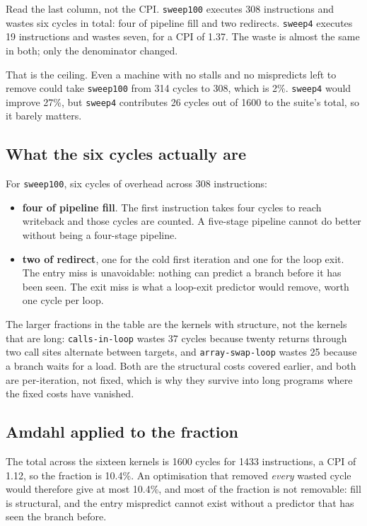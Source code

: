 \documentclass[11pt]{article}
\begin{document}
Read the last column, not the CPI. \texttt{sweep100} executes 308 instructions and wastes six
cycles in total: four of pipeline fill and two redirects. \texttt{sweep4} executes 19
instructions and wastes seven, for a CPI of 1.37. The waste is almost the same in both; only the
denominator changed.

That is the ceiling. Even a machine with no stalls and no mispredicts left to remove could take
\texttt{sweep100} from 314 cycles to 308, which is 2\%. \texttt{sweep4} would improve 27\%, but
\texttt{sweep4} contributes 26 cycles out of 1600 to the suite's total, so it barely matters.

\subsection{What the six cycles actually are}

For \texttt{sweep100}, six cycles of overhead across 308 instructions:

\begin{itemize}
\item \textbf{four of pipeline fill}. The first instruction takes four cycles to reach writeback
  and those cycles are counted. A five-stage pipeline cannot do better without being a
  four-stage pipeline.
\item \textbf{two of redirect}, one for the cold first iteration and one for the loop exit. The
  entry miss is unavoidable: nothing can predict a branch before it has been seen. The exit
  miss is what a loop-exit predictor would remove, worth one cycle per loop.
\end{itemize}

The larger fractions in the table are the kernels with structure, not the kernels that are long:
\texttt{calls-in-loop} wastes 37 cycles because twenty returns through two call sites alternate
between targets, and \texttt{array-swap-loop} wastes 25 because a branch waits for a load. Both
are the structural costs covered earlier, and both are per-iteration, not fixed, which is why
they survive into long programs where the fixed costs have vanished.

\subsection{Amdahl applied to the fraction}

The total across the sixteen kernels is 1600 cycles for 1433 instructions, a CPI of 1.12, so
the fraction is 10.4\%. An optimisation that removed \emph{every} wasted cycle would therefore
give at most 10.4\%, and most of the fraction is not removable: fill is structural, and the
entry mispredict cannot exist without a predictor that has seen the branch before.
\end{document}
